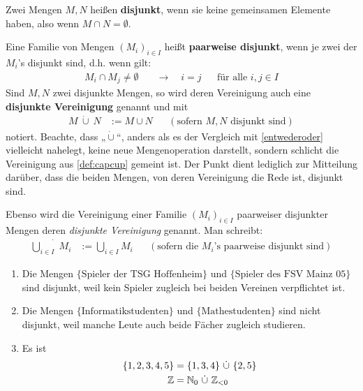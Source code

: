 \begin{defin}[Disjunktheit] \label{def:disjunkt} 
    Zwei Mengen $M,N$ heißen \textbf{disjunkt}, wenn sie keine gemeinsamen Elemente haben, also wenn $M\cap N=\emptyset$.

    Eine Familie von Mengen $(M_i)_{i\in I}$ heißt \textbf{paarweise disjunkt}, wenn je zwei der $M_i$'s disjunkt sind, d.h. wenn gilt:
    \begin{align*}
        M_i\cap M_j \neq  \emptyset \quad& \to\quad i=j &&\text{für alle $i,j\in I$}
    \end{align*}
    Sind $M,N$ zwei disjunkte Mengen, so wird deren Vereinigung auch eine \textbf{disjunkte Vereinigung} genannt und mit
    \begin{align*}
        M\ \dot\cup\ N & := M\cup N && (\text{sofern $M,N$ disjunkt sind})
    \end{align*}
    notiert. Beachte, dass „$\dot\cup$“, anders als es der Vergleich mit \cref{entwederoder} vielleicht nahelegt, keine neue Mengenoperation darstellt, sondern schlicht die Vereinigung aus \cref{def:capcup} gemeint ist. Der Punkt dient lediglich zur Mitteilung darüber, dass die beiden Mengen, von deren Vereinigung die Rede ist, disjunkt sind.

    Ebenso wird die Vereinigung einer Familie $(M_i)_{i\in I}$ paarweiser disjunkter Mengen deren \emph{disjunkte Vereinigung} genannt. Man schreibt:
    \begin{align*}
        \dot{\bigcup_{i\in I}}\ M_i & := \bigcup_{i\in I} M_i && (\text{sofern die $M_i$'s paarweise disjunkt sind})
    \end{align*}
\end{defin}


\begin{bsp} \label{bsp:disjunkt} \quad
    \begin{enumerate}
        \item Die Mengen $\{\text{Spieler der TSG Hoffenheim}\}$ und $\{\text{Spieler des FSV Mainz 05}\}$ sind disjunkt, weil kein Spieler zugleich bei beiden Vereinen verpflichtet ist.
        \item Die Mengen $\{\text{Informatikstudenten}\}$ und $\{\text{Mathestudenten}\}$ sind nicht disjunkt, weil manche Leute auch beide Fächer zugleich studieren.
        \item Es ist
        \begin{align*}
        \{1,2,3,4,5\} & = \{1,3,4\}\ \dot\cup\ \{2,5\} \\
        \mathbb Z & = \mathbb N_0\ \dot\cup\ \mathbb Z_{<0}
        \end{align*}
    \end{enumerate}
\end{bsp}


